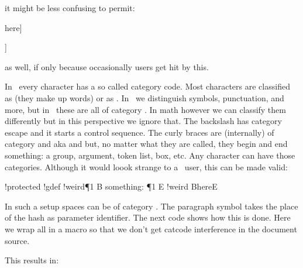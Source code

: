 \starttyping
{}

\setupfoo[before={\blank[big]}]
\stoptyping

it might be less confusing to permit:

\starttyping
\defineoverlay[whatever][some \command[withparameters] here]

\setupfoo[before=\blank[big]]
\stoptyping

as well, if only because occasionally users get hit by this.

\stopsectionlevel

\startsectionlevel[title=Duplicate hashes]

In \TEX\ every character has a so called category code. Most characters are
classified as  (they make up words) or as . In
\UNICODE\ we distinguish symbols, punctuation, and more, but in \TEX\ these are
all of category . In math however we can classify them differently
but in this perspective we ignore that. The backslash has category \quote
{escape} and it starts a control sequence. The curly braces are (internally) of
category  and  aka 
and  but, no matter what they are called, they begin and end
something: a group, argument, token list, box, etc. Any character can have those
categories. Although it would loook strange to a \TEX\ user, this can be made
valid:

\startbuffer
!protected !gdef !weird¶1
B
    something: ¶1
E
!weird BhereE
\stopbuffer

\typebuffer

In such a setup spaces can be of category . The paragraph
symbol takes the place of the hash as parameter identifier. The next code shows
how this is done. Here we wrap all in a macro so that we don't get catcode
interference in the document source.

\startbuffer[demo]
\NotSoTeX
{}
\stopbuffer

\typebuffer[demo]

This results in:

\startlines
\getbuffer [demo]
\stoplines

